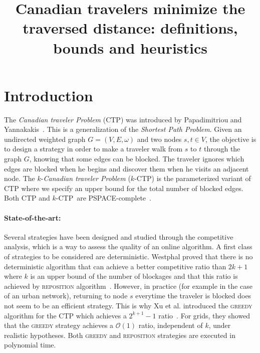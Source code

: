 \documentclass[letter-size, 11pt]{article}
\newcommand{\kctp}{$k$-CTP}
\begin{document}
\title{Canadian travelers minimize the traversed distance: definitions, bounds and heuristics}

\maketitle





\section{Introduction}

The \textit{Canadian traveler Problem} (CTP) was introduced by Papadimitriou and Yannakakis~\cite{PaYa91}. This is a generalization of the \textit{Shortest Path Problem}. Given an undirected weighted graph $G=(V,E,\omega)$ and two nodes $s,t \in V$, the objective is to design a strategy in order to make a traveler walk from $s$ to $t$ through the graph $G$, knowing that some edges can be blocked. The traveler ignores which edges are blocked when he begins and discover them when he visits an adjacent node. The $k$-\textit{Canadian traveler Problem} (\kctp) is the parameterized variant of CTP where we specify an upper bound for the total number of blocked edges. Both CTP and \kctp ~are PSPACE-complete~\cite{BaSc91,PaYa91}.

\paragraph{State-of-the-art:}Several strategies have been designed and studied through the competitive analysis, which is a way to assess the quality of an online algorithm. A first class of strategies to be considered are deterministic. Westphal proved that there is no deterministic algorithm that can achieve a better competitive ratio than $2k+1$ where $k$ is an upper bound of the number of blockages and that this ratio is achieved by \textsc{reposition} algorithm~\cite{We08}. However, in practice (for example in the case of an urban network), returning to node $s$ everytime the traveler is blocked does not seem to be an efficient strategy. This is why Xu et al. introduced the \textsc{greedy} algorithm for the CTP which achieves a $2^{k+1}-1$ ratio~\cite{XuHuSuZh09}. For grids, they showed that the \textsc{greedy} strategy achieves a $\mathcal{O}\left(1\right)$ ratio, independent of $k$, under realistic hypotheses. Both \textsc{greedy} and \textsc{reposition} strategies are executed in polynomial time.
\end{document}
